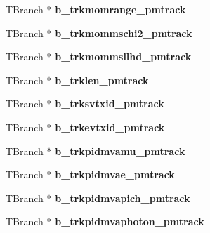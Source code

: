\begin{DoxyCompactItemize}
\item 
\hypertarget{classanatree_a5bb02256a7a2f3b81fbc3567f1241f63}{T\-Branch $\ast$ {\bfseries b\-\_\-trkmomrange\-\_\-pmtrack}}\label{classanatree_a5bb02256a7a2f3b81fbc3567f1241f63}

\item 
\hypertarget{classanatree_a60916370f2dddc226c224b1dbf02db0c}{T\-Branch $\ast$ {\bfseries b\-\_\-trkmommschi2\-\_\-pmtrack}}\label{classanatree_a60916370f2dddc226c224b1dbf02db0c}

\item 
\hypertarget{classanatree_ab37a745d92d64a057ed964899a67b997}{T\-Branch $\ast$ {\bfseries b\-\_\-trkmommsllhd\-\_\-pmtrack}}\label{classanatree_ab37a745d92d64a057ed964899a67b997}

\item 
\hypertarget{classanatree_ab493ed3597b226713def0475341d90d6}{T\-Branch $\ast$ {\bfseries b\-\_\-trklen\-\_\-pmtrack}}\label{classanatree_ab493ed3597b226713def0475341d90d6}

\item 
\hypertarget{classanatree_a196d28fbde8ad3263faf45b8c85117b3}{T\-Branch $\ast$ {\bfseries b\-\_\-trksvtxid\-\_\-pmtrack}}\label{classanatree_a196d28fbde8ad3263faf45b8c85117b3}

\item 
\hypertarget{classanatree_a1c0be1bb5c6c26c7024191b1c3653024}{T\-Branch $\ast$ {\bfseries b\-\_\-trkevtxid\-\_\-pmtrack}}\label{classanatree_a1c0be1bb5c6c26c7024191b1c3653024}

\item 
\hypertarget{classanatree_a6fd89f379642a84d1aa4505375b74843}{T\-Branch $\ast$ {\bfseries b\-\_\-trkpidmvamu\-\_\-pmtrack}}\label{classanatree_a6fd89f379642a84d1aa4505375b74843}

\item 
\hypertarget{classanatree_a9d73fd296b3092ca78be2916f09e3c8f}{T\-Branch $\ast$ {\bfseries b\-\_\-trkpidmvae\-\_\-pmtrack}}\label{classanatree_a9d73fd296b3092ca78be2916f09e3c8f}

\item 
\hypertarget{classanatree_af35237898d9339ee414e664675dad0b0}{T\-Branch $\ast$ {\bfseries b\-\_\-trkpidmvapich\-\_\-pmtrack}}\label{classanatree_af35237898d9339ee414e664675dad0b0}

\item 
\hypertarget{classanatree_a9e287ce9f79dc9a466e23f2446a909dc}{T\-Branch $\ast$ {\bfseries b\-\_\-trkpidmvaphoton\-\_\-pmtrack}}\label{classanatree_a9e287ce9f79dc9a466e23f2446a909dc}


\end{DoxyCompactItemize}
